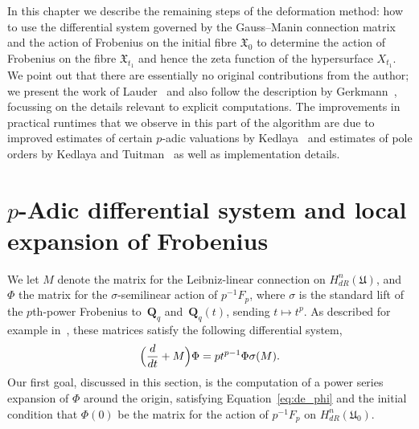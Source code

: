
In this chapter we describe the remaining steps of the deformation method:  
how to use the differential system governed by the Gauss--Manin connection 
matrix and the action of Frobenius on the initial fibre $\mathfrak{X}_0$ 
to determine the action of Frobenius on the fibre $\mathfrak{X}_{t_1}$ 
and hence the zeta function of the hypersurface $X_{t_1}$.
We point out that there are essentially no original contributions from the 
author;  we present the work of Lauder~\citep{Lau04} and also follow the 
description by Gerkmann~\citep{Gerkmann2007}, focussing on the details 
relevant to explicit computations.  The improvements in practical runtimes 
that we observe in this part of the algorithm are due to improved estimates 
of certain $p$-adic valuations by Kedlaya~\citep{Kedlaya2010} and estimates 
of pole orders by Kedlaya and Tuitman~\citep{KedlayaTuitman2012} as well as 
implementation details.

\section{$p$-Adic differential system and local expansion of Frobenius}

We let $M$ denote the matrix for the Leibniz-linear connection on 
$H_{dR}^n(\mathfrak{U})$, and $\Phi$ the matrix for the $\sigma$-semilinear 
action of $p^{-1} F_p$, where $\sigma$ is the standard lift of the $p$th-power 
Frobenius to~$\mathbf{Q}_q$ and~$\mathbf{Q}_q(t)$, sending $t \mapsto t^p$.  
As described for example in~\citep[\S 5]{Gerkmann2007}, these matrices satisfy 
the following differential system,
\begin{equation} \label{eq:de_phi}
\Bigl(\frac{d}{dt} + M\Bigr) \Phi = p t^{p-1} \Phi \sigma(M).
\end{equation}
Our first goal, discussed in this section, is the computation of 
a power series expansion of $\Phi$ around the origin, satisfying 
Equation~\eqref{eq:de_phi} and the initial condition that $\Phi(0)$ 
be the matrix for the action of $p^{-1} F_p$ on $H_{dR}^n(\mathfrak{U}_0)$.

